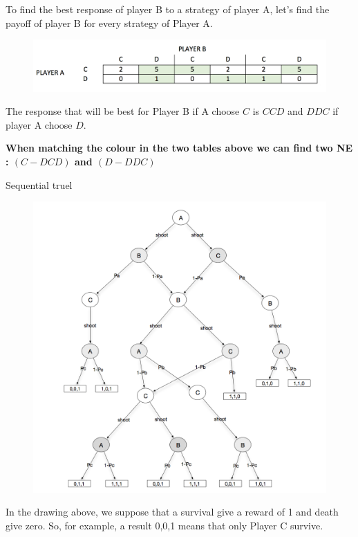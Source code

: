 \documentclass[11pt]{article}
\newenvironment{exercise}[2][Exercise]{\begin{trivlist}
\item[\hskip \labelsep {\bfseries #1}\hskip \labelsep {\bfseries #2.}]}{\end{trivlist}}
\begin{document}
To find the best response of player B to a strategy of player A, let's find the payoff of player B for every strategy of Player A.

\begin{figure}[H]
   \includegraphics[width=\textwidth]{img/exo2-table2.png}
\end{figure}

The response that will be best for Player B if A choose $C$ is ${CCD}$ and $DDC$ if player A choose $D$. 

\textbf{When matching the colour in the two tables above we can find two NE :
$(C - DCD)$ and $(D - DDC)$ }

\begin{exercise}{3} Sequential truel
\end{exercise}

 
\begin{figure}[H]
   \includegraphics[width=\textwidth]{img/exo3.png}
\end{figure}

In the drawing above, we suppose that a survival give a reward of 1 and death give zero. So, for example, a result 0,0,1 means that only Player C survive.
\end{document}
